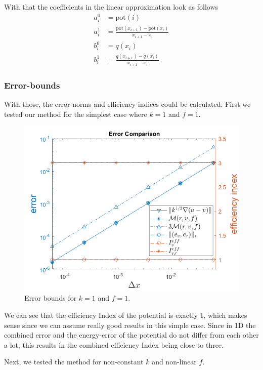 \documentclass{article}
\begin{document}
	With that the coefficients in the linear approximation look as follows
	\begin{align*}
	a_i^0 &= \mathrm{pot}(i)\\
	a_i^1 &= \frac{\mathrm{pot}(x_{i+1}) - \mathrm{pot}(x_i)}{x_{i+1} - x_i}\\
	b_i^0 &= q(x_i)\\
	b_i^1 &= \frac{q(x_{i+1}) - q(x_i)}{x_{i+1} - x_i}.
	\end{align*}
	
	\subsubsection*{Error-bounds}
	With those, the error-norms and efficiency indices could be calculated.
	First we tested our method for the simplest case where $k=1$ and $f=1$.
	
	\begin{figure}
		\centering
		\includegraphics[width = 0.8\linewidth]{diapos/convergenceplot_k_f_constant.png}
		\caption{Error bounds for $k=1$ and $f=1$.}
		\label{fig:kfconst}
	\end{figure}
	
	We can see that the efficiency Index of the potential is exactly 1, which makes sense since we can assume really good results in this simple case.
	Since in 1D the combined error and the energy-error of the potential do not differ from each other a lot, this results in the combined efficiency Index being close to three.
	
	Next, we tested the method for non-constant $k$ and non-linear $f$.
	
\end{document}
